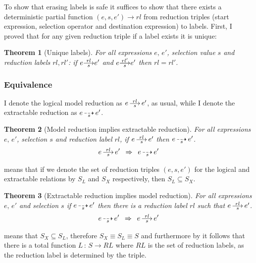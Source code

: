 \documentclass[12pt,twoside,notitlepage]{report}
\newcommand{\red}[2]{\stackon[.05ex]{\stackunder[-0.05ex]{$\longrightarrow$}{$\scriptstyle #1$}}{$\scriptstyle #2$}}
\newcommand{\xred}[1]{\stackunder[-0.05ex]{$\dashrightarrow$}{$\scriptstyle #1$}}
\theoremstyle{plain}%
\newtheorem{thm}{Theorem}[section]
\theoremstyle{definition}
\theoremstyle{remark}
\begin{document}
To show that erasing labels is safe it suffices to show that there exists a deterministic partial function $ (e,s,e') \rightarrow rl $ from reduction triples (start expression, selection operator and destination expression) to labels. First, I proved that for any given reduction triple if a label exists it is unique:
\begin{thm}[Unique labels]
\label{thm:unique_label}
For all expressions $ e,\, e'$, selection value $ s $ and reduction labels $ rl, rl' $:
 if $ e \red{s}{rl}e' $ and $ e \red{s}{rl'}e' $ then $ rl = rl' $. 
\end{thm}
\subsubsection{Equivalence}
I denote the logical model reduction as $ e\, \red{s}{rl}\, e' $, as usual, while I denote the extractable reduction as $ e\, \xred{s}\, e' $.

\begin{thm}[Model reduction implies extractable reduction]
\label{thm:jo_to_xjo}
For all expressions $ e,\,e' $, selection $ s $ and reduction label $ rl $, if $ e\, \red{s}{rl}\, e' $ then $  e\, \xred{s}\, e' $.
\[  e\, \red{s}{rl}\, e' \,\,\,\Rightarrow \,\,\, e\, \xred{s}\, e' \]
\end{thm}

 means that if we denote the set of reduction triples $ (e,s,e') $ for the logical and extractable relations by $ S_L $ and $ S_X $ respectively, then $ S_L \subseteq S_X $.

\begin{thm}[Extractable reduction implies model reduction]
\label{thm:xjo_to_jo}
For all expressions $ e,\,e' $ and selection $ s $ if $ e\, \xred{s}\, e' $ then there is a reduction label $ rl $ such that $ e\, \red{s}{rl}\, e' $.
\[ e\, \xred{s}\, e' \,\,\,\Rightarrow \,\,\,  e\, \red{s}{rl}\, e' \]
\end{thm}

 means that $ S_X \subseteq S_L $, therefore $ S_X \equiv S_L \equiv S $ and furthermore by  it follows that there is a total function $ L\,:\, S \rightarrow RL $ where $ RL $ is the set of reduction labels, as the reduction label is determined by the triple.

\end{document}
